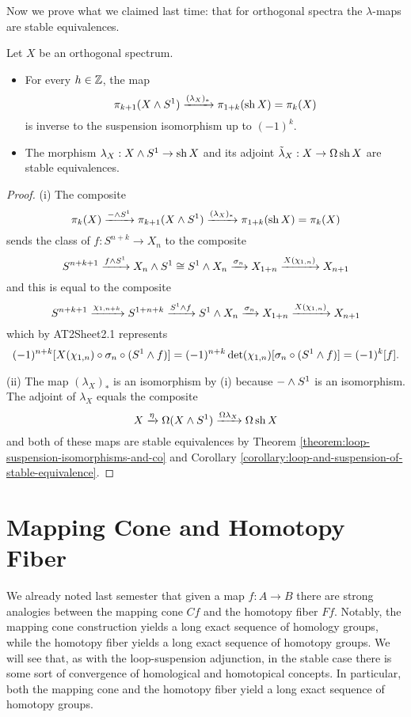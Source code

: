 

\noindent
Now we prove what we claimed last time: that for orthogonal spectra the $\lambda$-maps are stable equivalences.

\begin{theorem}
Let $X$ be an orthogonal spectrum.
\begin{itemize}
    \item[i)] For every $h\in{\mathbb Z}$, the map
    \[\pi_{k+1}(X\wedge S^1)\xrightarrow{(\lambda_X)_*}\pi_{1+k}(\operatorname{sh} X)=\pi_k(X)\]
    is inverse to the suspension isomorphism up to $(-1)^k$.
    \item[ii)] The morphism $\lambda_X:X\wedge S^1\to\operatorname{sh} X$ and its adjoint $\tilde\lambda_X:X\to\Omega\operatorname{sh} X$ are stable equivalences.
\end{itemize}
\end{theorem}

\begin{proof}
(i) The composite
\[\pi_k(X)\xrightarrow{-\wedge S^1}\pi_{k+1}(X\wedge S^1)\xrightarrow{(\lambda_X)_*}\pi_{1+k}(\operatorname{sh} X)=\pi_k(X)\]
sends the class of $f:S^{n+k}\to X_n$ to the composite
\[S^{n+k+1}\xrightarrow{f\wedge S^1}X_n\wedge S^1\cong S^1\wedge X_n\xrightarrow{\sigma_n}X_{1+n}\xrightarrow{X(\chi_{1,n})}X_{n+1}\]
and this is equal to the composite
\[S^{n+k+1}\xrightarrow{\chi_{1,n+k}}S^{1+n+k}\xrightarrow{S^1\wedge f}S^1\wedge X_n\xrightarrow{\sigma_n}X_{1+n}\xrightarrow{X(\chi_{1,n})}X_{n+1}\]
which by AT2Sheet2.1 represents
\[(-1)^{n+k}[X(\chi_{1,n})\circ\sigma_n\circ(S^1\wedge f)]=(-1)^{n+k}\operatorname{det}(\chi_{1,n})[\sigma_n\circ(S^1\wedge f)]=(-1)^k[f].\]

(ii) The map $(\lambda_X)_*$ is an isomorphism by (i) because $-\wedge S^1$ is an isomorphism. The adjoint of $\lambda_X$ equals the composite
\[X\xrightarrow{\eta}\Omega(X\wedge S^1)\xrightarrow{\Omega\lambda_X}\Omega\operatorname{sh} X\]
and both of these maps are stable equivalences by Theorem \ref{theorem:loop-suspension-isomorphisms-and-co} and Corollary \ref{corollary:loop-and-suspension-of-stable-equivalence}.
\end{proof}

\section{Mapping Cone and Homotopy Fiber}

We already noted last semester that given a map $f:A\to B$ there are strong analogies between the mapping cone $Cf$ and the homotopy fiber $Ff$. Notably, the mapping cone construction yields a long exact sequence of homology groups, while the homotopy fiber yields a long exact sequence of homotopy groups. We will see that, as with the loop-suspension adjunction, in the stable case there is some sort of convergence of homological and homotopical concepts. In particular, both the mapping cone and the homotopy fiber yield a long exact sequence of homotopy groups.

